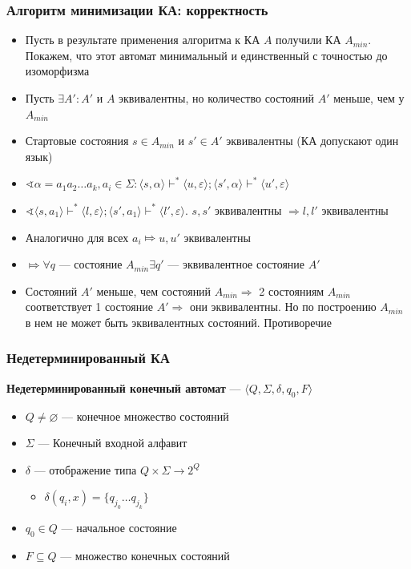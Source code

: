\documentclass{beamer}
\begin{document}
\begin{frame}[fragile]
  \transwipe[direction=90]
  \frametitle{Алгоритм минимизации КА: корректность}   
    \begin{itemize}
      \item Пусть в результате применения алгоритма к КА $A$ получили КА $A_{min}$. Покажем, что этот автомат минимальный и единственный с точностью до изоморфизма
      \item Пусть $\exists A' : A'$ и $A$ эквивалентны, но количество состояний $A'$ меньше, чем у $A_{min}$
      \item Стартовые состояния $s \in A_{min}$ и $s' \in A'$ эквивалентны (КА допускают один язык)
      \item $\sphericalangle \alpha = a_1 a_2 \dots a_k, a_i \in \Sigma: \langle s, \alpha \rangle \vdash^* \langle u, \varepsilon \rangle; \langle s', \alpha \rangle \vdash^* \langle u', \varepsilon \rangle$
      \item $\sphericalangle \langle s, a_1 \rangle \vdash^* \langle l, \varepsilon \rangle; \langle s', a_1 \rangle \vdash^* \langle l', \varepsilon \rangle$. $s, s'$ эквивалентны $\Rightarrow l, l'$ эквивалентны
      \item Аналогично для всех $a_i \Mapsto u, u'$ эквивалентны 
      \item $\Mapsto \forall q$ --- состояние $A_{min} \exists q'$ --- эквивалентное состояние $A'$
      \item Состояний $A'$ меньше, чем состояний $A_{min} \Rightarrow$ 2 состояниям $A_{min}$ соответствует 1 состояние $A' \Rightarrow$ они эквивалентны. Но по построению $A_{min}$ в нем не может быть эквивалентных состояний. Противоречие
    \end{itemize}
    
\end{frame}

\begin{frame}[fragile]
  \transwipe[direction=90]
  \frametitle{Недетерминированный КА}   
 \textbf{Недетерминированный конечный автомат} --- $\langle Q, \Sigma, \delta, q_0, F \rangle$
  \begin{itemize}
    \item $Q \neq \varnothing$ --- конечное множество состояний
    \item $\Sigma$ --- Конечный входной алфавит
    \item $\delta$ --- отображение типа $Q \times \Sigma \rightarrow 2^Q$
    \begin{itemize}
      \item $\delta(q_i, x) = \{ q_{j_0} \dots q_{j_k} \}$
    \end{itemize}
    \item $q_0 \in Q$ --- начальное состояние
    \item $F \subseteq Q$ --- множество конечных состояний
  \end{itemize}
    
\end{frame}
\end{document}
